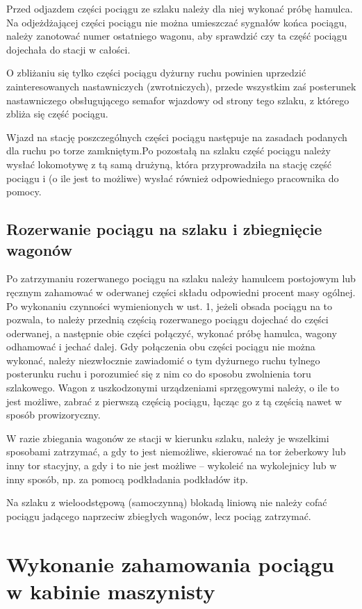 Przed odjazdem części pociągu ze szlaku należy dla niej wykonać próbę hamulca. Na odjeżdżającej części pociągu nie można umieszczać sygnałów końca pociągu, należy zanotować numer ostatniego wagonu, aby sprawdzić czy ta część pociągu dojechała do stacji w całości.

O zbliżaniu się tylko części pociągu dyżurny ruchu powinien uprzedzić zainteresowanych nastawniczych (zwrotniczych), przede wszystkim zaś posterunek nastawniczego obsługującego semafor wjazdowy od strony tego szlaku, z którego zbliża
się część pociągu.

Wjazd na stację poszczególnych części pociągu następuje na zasadach podanych dla ruchu po torze zamkniętym.Po pozostałą na szlaku część pociągu należy wysłać lokomotywę z tą samą drużyną, która przyprowadziła na stację część pociągu i (o
ile jest to możliwe) wysłać również odpowiedniego pracownika do pomocy.

\section{Rozerwanie pociągu na szlaku i zbiegnięcie wagonów}

Po zatrzymaniu rozerwanego pociągu na szlaku należy hamulcem postojowym lub ręcznym zahamować w oderwanej części składu odpowiedni procent masy ogólnej. Po wykonaniu czynności wymienionych w ust. 1, jeżeli obsada pociągu na to pozwala, to należy przednią częścią rozerwanego pociągu dojechać do części oderwanej, a następnie obie części połączyć, wykonać próbę hamulca, wagony odhamować i jechać dalej. Gdy połączenia obu części pociągu nie można wykonać, należy niezwłocznie zawiadomić o tym dyżurnego ruchu tylnego posterunku ruchu i porozumieć się z nim co do sposobu zwolnienia toru szlakowego. Wagon z uszkodzonymi urządzeniami sprzęgowymi należy, o ile to jest możliwe, zabrać z pierwszą częścią pociągu, łącząc go z tą częścią nawet w sposób prowizoryczny.

W razie zbiegania wagonów ze stacji w kierunku szlaku, należy je wszelkimi sposobami zatrzymać, a gdy to jest niemożliwe, skierować na tor żeberkowy lub inny tor stacyjny, a gdy i to nie jest możliwe – wykoleić na wykolejnicy lub w inny sposób, np. za pomocą podkładania podkładów itp. 

Na szlaku z wieloodstępową (samoczynną) blokadą liniową nie należy cofać pociągu jadącego naprzeciw zbiegłych wagonów, lecz pociąg zatrzymać.

\chapter{Wykonanie zahamowania pociągu w kabinie maszynisty}

